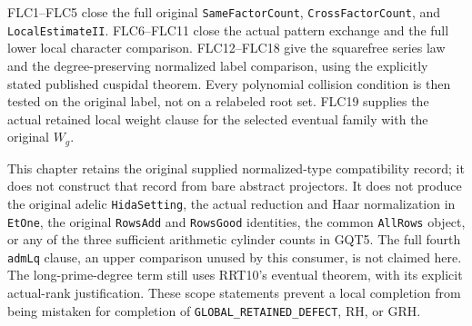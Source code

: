 FLC1--FLC5 close the full original \texttt{SameFactorCount},
\texttt{CrossFactorCount}, and \texttt{LocalEstimateII}.
FLC6--FLC11 close the actual pattern exchange and the full
lower local character comparison.  FLC12--FLC18 give the
squarefree series law and the degree-preserving normalized
label comparison, using the explicitly stated published
cuspidal theorem.  Every polynomial collision condition is
then tested on the original label, not on a relabeled root
set.  FLC19 supplies the actual retained local weight clause
for the selected eventual family with the original $W_g$.

This chapter retains the original supplied normalized-type
compatibility record; it does not construct that record from
bare abstract projectors.  It does not produce the original
adelic \texttt{HidaSetting}, the actual reduction and Haar
normalization in \texttt{EtOne}, the original
\texttt{RowsAdd} and \texttt{RowsGood} identities, the common
\texttt{AllRows} object, or any of the three sufficient
arithmetic cylinder counts in GQT5.  The full fourth
\texttt{admLq} clause, an upper comparison unused by this
consumer, is not claimed here.  The long-prime-degree term
still uses RRT10's eventual theorem, with its explicit
actual-rank justification.  These scope statements prevent
a local completion from being mistaken for completion of
\texttt{GLOBAL\_RETAINED\_DEFECT}, RH, or GRH.
